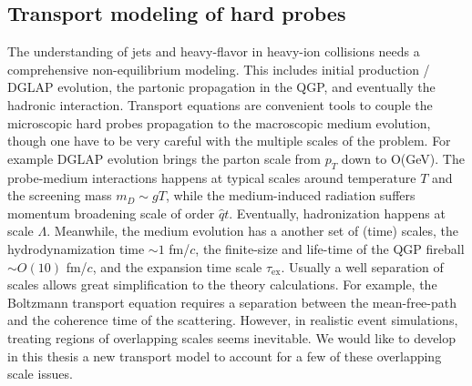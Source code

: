 \subsection{Transport modeling of hard probes}
The understanding of jets and heavy-flavor in heavy-ion collisions needs a comprehensive non-equilibrium modeling.
This includes initial production / DGLAP evolution, the partonic propagation in the QGP, and eventually the hadronic interaction.
Transport equations are convenient tools to couple the microscopic hard probes propagation to the macroscopic medium evolution, though one have to be very careful with the multiple scales of the problem.
For example DGLAP evolution brings the parton scale from $p_T$ down to O(GeV).
The probe-medium interactions happens at typical scales around temperature $T$ and the screening mass $m_D \sim gT$, while the medium-induced radiation suffers momentum broadening scale of order $\hat{q} t$.
Eventually, hadronization happens at scale $\Lambda$.
Meanwhile, the medium evolution has a another set of (time) scales, the hydrodynamization time $\sim 1$ fm/$c$, the finite-size and life-time of the QGP fireball $\sim O(10)$  fm/$c$, and the expansion time scale $\tau_{\textrm{ex}}$.
Usually a well separation of scales allows great simplification to the theory calculations.
For example, the Boltzmann transport equation requires a separation between the mean-free-path and the coherence time of the scattering.
However, in realistic event simulations, treating regions of overlapping scales seems inevitable.
We would like to develop in this thesis a new transport model to account for a few of these overlapping scale issues.

